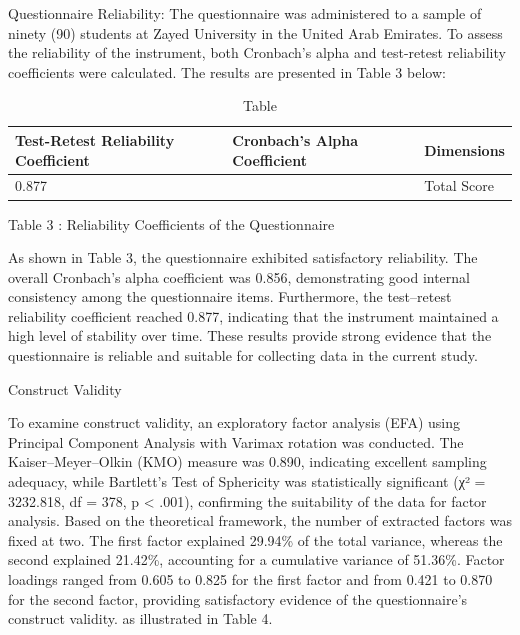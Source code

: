 \documentclass{NSP1}
\begin{document}
Questionnaire Reliability: The questionnaire was administered to a sample of ninety (90) students at Zayed University in the United Arab Emirates. To assess the reliability of the instrument, both Cronbach's alpha and test-retest reliability coefficients were calculated. The results are presented in Table 3 below:

\begin{table}[tbp]
\centering
{\renewcommand{\arraystretch}{1.54}\small
\begin{tabular}{|>{\centering\arraybackslash}p{}|>{\centering\arraybackslash}p{}|>{\centering\arraybackslash}p{}|}
\hline
\cellcolor[HTML]{DDD9C3}\textbf{Test-Retest Reliability Coefficient} & \cellcolor[HTML]{DDD9C3}\textbf{Cronbach's Alpha Coefficient} & \cellcolor[HTML]{DDD9C3}\textbf{Dimensions} \\
\hline
\cellcolor[HTML]{DDD9C3}0.877 & 0.856 & Total Score \\
\hline
\end{tabular}}
\caption{Table}

\end{table}

Table 3 : Reliability Coefficients of the Questionnaire

As shown in Table 3, the questionnaire exhibited satisfactory reliability. The overall Cronbach's alpha coefficient was 0.856, demonstrating good internal consistency among the questionnaire items. Furthermore, the test–retest reliability coefficient reached 0.877, indicating that the instrument maintained a high level of stability over time. These results provide strong evidence that the questionnaire is reliable and suitable for collecting data in the current study.

Construct Validity

To examine construct validity, an exploratory factor analysis (EFA) using Principal Component Analysis with Varimax rotation was conducted. The Kaiser–Meyer–Olkin (KMO) measure was 0.890, indicating excellent sampling adequacy, while Bartlett's Test of Sphericity was statistically significant (χ² = 3232.818, df = 378, p \textless{} .001), confirming the suitability of the data for factor analysis. Based on the theoretical framework, the number of extracted factors was fixed at two. The first factor explained 29.94\% of the total variance, whereas the second explained 21.42\%, accounting for a cumulative variance of 51.36\%. Factor loadings ranged from 0.605 to 0.825 for the first factor and from 0.421 to 0.870 for the second factor, providing satisfactory evidence of the questionnaire's construct validity. as illustrated in Table 4.
\end{document}
